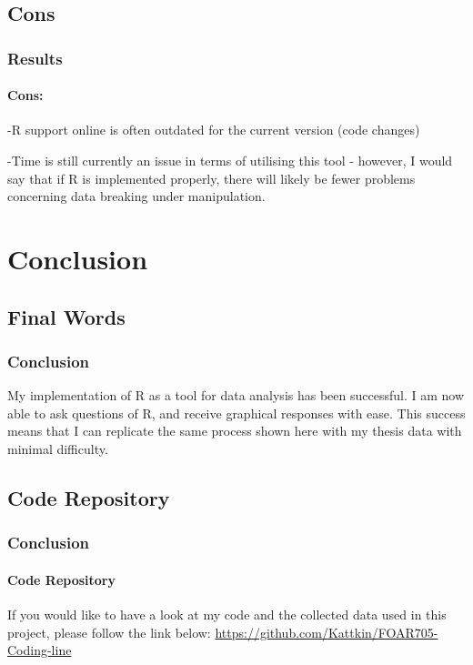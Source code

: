 \documentclass{beamer}
\begin{document}
\subsection{Cons}
\begin{frame}
\frametitle{Results}
\framesubtitle{Cons:}
\item -R support online is often outdated for the current version (code changes)
\item -Time is still currently an issue in terms of utilising this tool - however, I would say that if R is implemented properly, there will likely be fewer problems concerning data breaking under manipulation. 
\end{frame}

\section{Conclusion}
\subsection{Final Words}
\begin{frame}
\frametitle{Conclusion}
My implementation of R as a tool for data analysis has been successful.
\newline 
I am now able to ask questions of R, and receive graphical responses with ease.
\newline 
This success means that I can replicate the same process shown here with my thesis data with minimal difficulty.
\end{frame}

\subsection{Code Repository}
\begin{frame}
\frametitle{Conclusion}
\framesubtitle{Code Repository}
If you would like to have a look at my code and the collected data used in this project, please follow the link below:
\newline
\newline
\url{https://github.com/Kattkin/FOAR705-Coding-line}
\end{frame}
 
\end{document}
